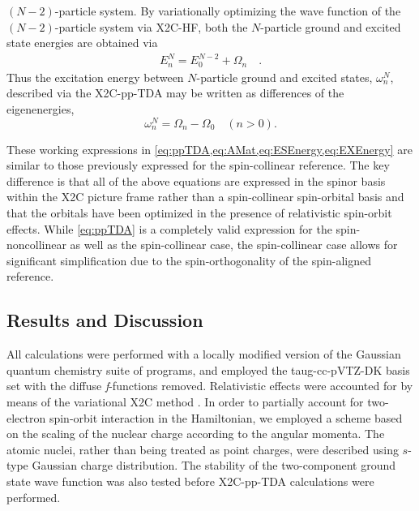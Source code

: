 $(N-2)$-particle system. By variationally optimizing the wave function of the $(N-2)$-particle system via X2C-HF, both the $N$-particle ground and excited state energies are obtained via
\begin{align}
E_n^N = E_0^{N-2} + \Omega_n \quad . \label{eq:ESEnergy}
\end{align}
Thus the excitation energy between $N$-particle ground and excited states, $\omega_n^N$, described via the X2C-pp-TDA may be written as differences of the eigenenergies,
\begin{equation}
\omega_n^N = \Omega_n - \Omega_0 \quad (n > 0). \label{eq:EXEnergy}
\end{equation}

These working expressions in \cref{eq:ppTDA,eq:AMat,eq:ESEnergy,eq:EXEnergy} are similar to those previously expressed for the spin-collinear reference.\cite{Yang13_224105,Yang13_18A522,Yang13_104112}
The key difference is that all of the above equations are expressed in the spinor basis within the X2C picture frame rather than a spin-collinear spin-orbital basis and that the orbitals have been optimized in the presence of relativistic spin-orbit effects. 
While \cref{eq:ppTDA} is a completely valid expression for the spin-noncollinear  as well as the spin-collinear case,
the spin-collinear case allows for significant simplification due to the spin-orthogonality of the spin-aligned reference\cite{Yang13_224105,Yang13_174110}.

\subsection{Results and Discussion}
\label{sec:ppX2CResults}

All calculations were performed with a locally modified version of the Gaussian quantum chemistry suite of programs,\cite{GDVI06}
and employed the taug-cc-pVTZ-DK basis set\cite{Dixon01_48} with the diffuse \emph{f}-functions removed.
Relativistic effects were accounted for by means of the variational X2C method .\cite{Reiher13_184105,Saue11_3077,Liu09_219,Liu10_532,Liu09_1945}
In order to partially account for two-electron spin-orbit interaction in the Hamiltonian, we employed a scheme based on the scaling of the nuclear charge according to the angular momenta.\cite{Boettger00_7809}
The atomic nuclei, rather than being treated as point charges, were described using $s$-type Gaussian charge distribution.\cite{Dyall97_207,Saue98_920}
The stability of the two-component ground state wave function was also tested before X2C-pp-TDA calculations were performed.\cite{Li15_154109}

